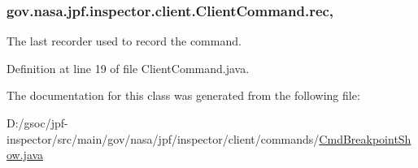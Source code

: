 \subsubsection[{\texorpdfstring{rec}{rec}}]{ gov.\+nasa.\+jpf.\+inspector.\+client.\+Client\+Command.\+rec\hspace{0.3cm}{\ttfamily [protected]}, {\ttfamily [inherited]}}\hypertarget{classgov_1_1nasa_1_1jpf_1_1inspector_1_1client_1_1_client_command_af4246f2427035c72a6af45a2c61361f7}{}\label{classgov_1_1nasa_1_1jpf_1_1inspector_1_1client_1_1_client_command_af4246f2427035c72a6af45a2c61361f7}


The last recorder used to record the command. 



Definition at line 19 of file Client\+Command.\+java.



The documentation for this class was generated from the following file\+:\begin{DoxyCompactItemize}
\item 
D\+:/gsoc/jpf-\/inspector/src/main/gov/nasa/jpf/inspector/client/commands/\hyperlink{_cmd_breakpoint_show_8java}{Cmd\+Breakpoint\+Show.\+java}\end{DoxyCompactItemize}

